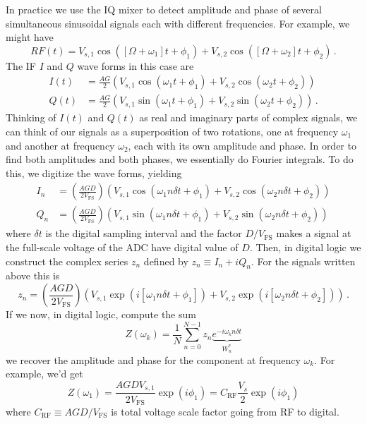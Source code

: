
In practice we use the IQ mixer to detect amplitude and phase of several simultaneous sinusoidal signals each with different frequencies.
For example, we might have
\begin{equation}
  RF(t) = V_{s,1} \cos([\Omega + \omega_1] t + \phi_1 ) + V_{s,2} \cos([\Omega + \omega_2] t + \phi_2) \, .
\end{equation}
The IF $I$ and $Q$ wave forms in this case are
\begin{align}
  I(t) &= \frac{A G}{2} \left( V_{s,1} \cos(\omega_1 t + \phi_1) + V_{s,2} \cos(\omega_2 t + \phi_2) \right) \\
  Q(t) &= \frac{A G}{2} \left( V_{s,1} \sin(\omega_1 t + \phi_1) + V_{s,2} \sin(\omega_2 t + \phi_2) \right) \, .
\end{align}
Thinking of $I(t)$ and $Q(t)$ as real and imaginary parts of complex signals, we can think of our signals as a superposition of two rotations, one at frequency $\omega_1$ and another at frequency $\omega_2$, each with its own amplitude and phase.
In order to find both amplitudes and both phases, we essentially do Fourier integrals.
To do this, we digitize the wave forms, yielding
\begin{align}
  I_n &= \left( \frac{A G D}{2 V_\text{FS}} \right) \left( V_{s,1} \cos(\omega_1 n \delta t + \phi_1) + V_{s,2} \cos(\omega_2 n \delta t + \phi_2) \right) \\
  Q_n &= \left( \frac{A G D}{2 V_\text{FS}} \right) \left( V_{s,1} \sin(\omega_1 n \delta t + \phi_1) + V_{s,2} \sin(\omega_2 n \delta t + \phi_2) \right)
\end{align}
where $\delta t$ is the digital sampling interval and the factor $D / V_\text{FS}$ makes a signal at the full-scale voltage of the ADC have digital value of $D$.
Then, in digital logic we construct the complex series $z_n$ defined by $z_n \equiv I_n + i Q_n$.
For the signals written above this is
\begin{equation}
z_n =
  \left( \frac{A G D}{2 V_\text{FS}} \right)
  \left(
    V_{s,1} \exp \left( i \left[ \omega_1 n \delta t + \phi_1 \right] \right)
  + V_{s,2} \exp \left( i \left[ \omega_2 n \delta t + \phi_2 \right] \right)
  \right) \, .
\end{equation}
If we now, in digital logic, compute the sum
\begin{equation}
  Z(\omega_k) = \frac{1}{N} \sum_{n=0}^{N-1} z_n \underbrace{e^{-i \omega_k n \delta t}}_{W_n^*}
\end{equation}
we recover the amplitude and phase for the component at frequency $\omega_k$.
For example, we'd get
\begin{equation*}
  Z(\omega_1)
  = \frac{A G D V_{s,1}}{2 V_\text{FS}} \exp(i \phi_1)
  = C_\text{RF} \frac{V_s}{2} \exp(i \phi_1)
\end{equation*}
where $C_\text{RF} \equiv AGD/V_\text{FS}$ is total voltage scale factor going from RF to digital.

